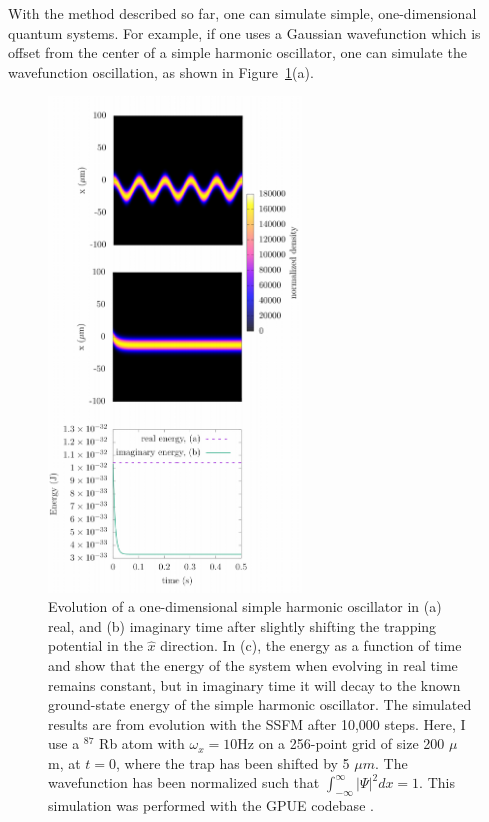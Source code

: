 With the method described so far, one can simulate simple, one-dimensional quantum systems.
For example, if one uses a Gaussian wavefunction which is offset from the center of a simple harmonic oscillator, one can simulate the wavefunction oscillation, as shown in Figure~\ref{fig:evolve}(a).

\begin{figure}

\center \includegraphics[width=0.6\textwidth]{data/splitop/SHO/SHO_gimp.pdf}

\caption{Evolution of a one-dimensional simple harmonic oscillator in (a) real, and (b) imaginary time after slightly shifting the trapping potential in the $\hat x$ direction.
In (c), the energy as a function of time and show that the energy of the system when evolving in real time remains constant, but in imaginary time it will decay to the known ground-state energy of the simple harmonic oscillator.
The simulated results are from evolution with the SSFM after 10,000 steps.
Here, I use a $^{87}$ Rb atom with $\omega_x = 10$Hz on a 256-point grid of size 200 $\mu$m, at $t = 0$, where the trap has been shifted by 5 $\mu m$.
The wavefunction has been normalized such that $\int_{-\infty}^\infty|\Psi|^2 dx = 1$.
This simulation was performed with the GPUE codebase \cite{schloss2018}.}
\label{fig:evolve}
\end{figure}

